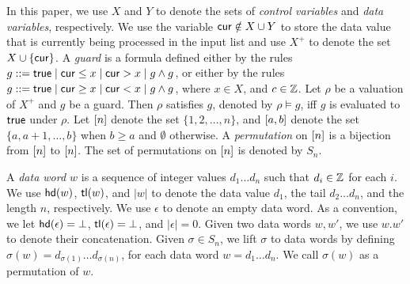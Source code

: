 In this paper, we use $X$ and $Y$ to denote the sets of \emph{control variables} and \emph{data variables}, respectively. We use the variable $\mathsf{cur} \notin X\cup Y$ to store the data value that is currently being processed in the input list and use $X^+$ to denote the set $X\cup \{\mathsf{cur}\}$.
A \emph{guard} is a formula defined either by the rules $g::= \mathsf{true} \mid \mathsf{cur} \le x \mid \mathsf{cur} > x \mid g \wedge g$, or either by the rules $g::= \mathsf{true} \mid \mathsf{cur} \ge x \mid \mathsf{cur} < x \mid g \wedge g$, where $x \in X$, and $c\in {\mathbb{Z} }$. 
Let $\rho$ be a valuation of $X^+$ and $g$ be a guard. Then $\rho$ satisfies $g$, denoted by $\rho \models g$, iff $g$ is evaluated to $\mathsf{true}$ under $\rho$. 
Let $[n]$ denote the set $\{ 1, 2, \dots, n \}$, and $[a,b]$ denote the set $\{ a, a+1, \dots, b \}$ when $b\geq a$ and $\emptyset$ otherwise. A \emph{permutation} on
$[n]$ is a bijection from $[n]$ to
$[n]$. The set of
permutations on $[n]$ is denoted by $S_n$.

A \emph{data word $w$} is a sequence of integer values $d_1\dots d_n$ such that $d_i \in {\mathbb{Z} }$ for each $i$.
We use $\mathsf{hd}(w)$, $\mathsf{tl}(w)$, and $|w|$ to denote the data value $d_1$, the tail $d_2\dots d_n$, and the length $n$, respectively.
We use $\epsilon$ to denote an empty data word. As a convention, we let $\mathsf{hd}(\epsilon)=\bot$, $\mathsf{tl}(\epsilon)=\bot$, and $|\epsilon|=0$.
Given two data words $w,w'$, we use $w.w'$ to denote their concatenation.
Given $\sigma \in S_n$, we lift $\sigma$ to data words by defining $\sigma(w)=d_{\sigma(1)} \dots d_{\sigma(n)}$, for each data word $w=d_1\dots d_n$. We call $\sigma(w)$ as a permutation of $w$.